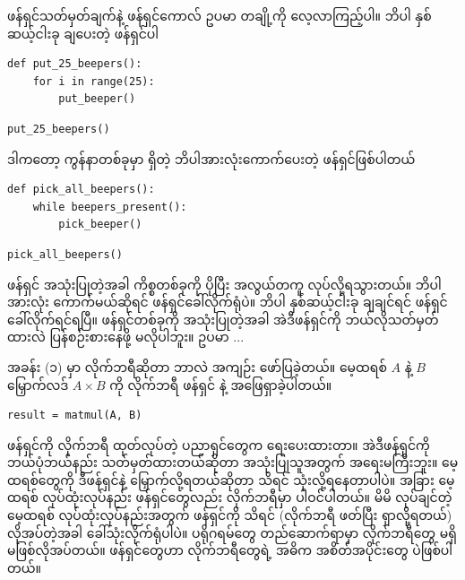 ဖန်ရှင်သတ်မှတ်ချက်နဲ့ ဖန်ရှင်ကောလ် ဥပမာ တချို့ကို လေ့လာကြည့်ပါ။ ဘိပါ နှစ်ဆယ့်ငါးခု ချပေးတဲ့  ဖန်ရှင်ပါ 
%
\setlength{\fboxsep}{0pt}
\begin{verbatim}
def put_25_beepers():
    for i in range(25):
        put_beeper()
\end{verbatim}
%
\betweenminted{\medskipamount}
%
\setlength{\fboxsep}{0pt}
\begin{verbatim}
put_25_beepers()
\end{verbatim}
%
ဒါကတော့ ကွန်နာတစ်ခုမှာ ရှိတဲ့ ဘိပါအားလုံးကောက်ပေးတဲ့ ဖန်ရှင်ဖြစ်ပါတယ်
%
\setlength{\fboxsep}{0pt}
\begin{verbatim}
def pick_all_beepers():
    while beepers_present():
        pick_beeper()
\end{verbatim}
%
\betweenminted{\medskipamount}
%
\setlength{\fboxsep}{0pt}
\begin{verbatim}
pick_all_beepers()
\end{verbatim}
%

ဖန်ရှင် အသုံးပြုတဲ့အခါ  ကိစ္စတစ်ခုကို ပိုပြီး အလွယ်တကူ လုပ်လို့ရသွားတယ်။ ဘိပါအားလုံး ကောက်မယ်ဆိုရင်  ဖန်ရှင်ခေါ်လိုက်ရုံပဲ။ ဘိပါ နှစ်ဆယ့်ငါးခု ချချင်ရင်  ဖန်ရှင်ခေါ်လိုက်ရင်ရပြီ။ ဖန်ရှင်တစ်ခုကို အသုံးပြုတဲ့အခါ အဲဒီဖန်ရှင်ကို ဘယ်လိုသတ်မှတ်ထားလဲ ပြန်စဉ်းစားနေဖို့ မလိုပါဘူး။ ဥပမာ $...$ 

အခန်း (၁) မှာ လိုက်ဘရီဆိုတာ ဘာလဲ အကျဉ်း ဖော်ပြခဲ့တယ်။    မေ့ထရစ် $A$ နဲ့ $B$ မြှောက်လဒ် $A \times B$ ကို  လိုက်ဘရီ ဖန်ရှင်  နဲ့ အဖြေရှာခဲ့ပါတယ်။ 
%
\setlength{\fboxsep}{0pt}
\begin{verbatim}
result = matmul(A, B)
\end{verbatim}
%
 ဖန်ရှင်ကို လိုက်ဘရီ ထုတ်လုပ်တဲ့ ပညာရှင်တွေက ရေးပေးထားတာ။ အဲဒီဖန်ရှင်ကို ဘယ်ပုံဘယ်နည်း သတ်မှတ်ထားတယ်ဆိုတာ အသုံးပြုသူအတွက် အရေးမကြီးဘူး။ မေ့ထရစ်တွေကို ဒီဖန်ရှင်နဲ့ မြှောက်လို့ရတယ်ဆိုတာ သိရင် သုံးလို့ရနေတာပါပဲ။ အခြား မေ့ထရစ် လုပ်ထုံးလုပ်နည်း ဖန်ရှင်တွေလည်း   လိုက်ဘရီမှာ ပါဝင်ပါတယ်။ မိမိ လုပ်ချင်တဲ့ မေ့ထရစ် လုပ်ထုံးလုပ်နည်းအတွက် ဖန်ရှင်ကို သိရင် (လိုက်ဘရီ  ဖတ်ပြီး ရှာလို့ရတယ်) လိုအပ်တဲ့အခါ ခေါ်သုံးလိုက်ရုံပါပဲ။  ပရိုဂရမ်တွေ တည်ဆောက်ရာမှာ လိုက်ဘရီတွေ မရှိမဖြစ်လိုအပ်တယ်။ ဖန်ရှင်တွေဟာ လိုက်ဘရီတွေရဲ့ အဓိက အစိတ်အပိုင်းတွေ ပဲဖြစ်ပါတယ်။

